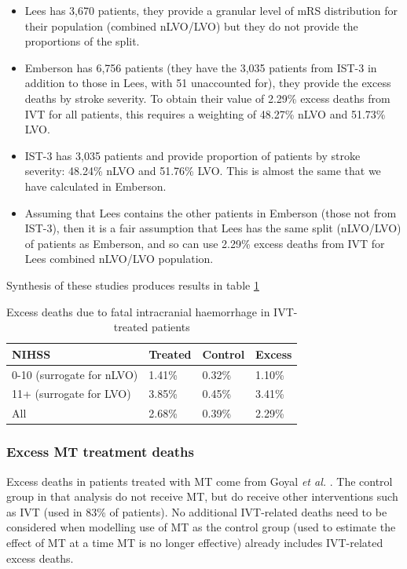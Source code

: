 \begin{itemize}
    \item Lees has 3,670 patients, they provide a granular level of mRS distribution for their population (combined nLVO/LVO) but they do not provide the proportions of the split.
    \item Emberson has 6,756 patients (they have the 3,035 patients from IST-3 in addition to those in Lees, with 51 unaccounted for), they provide the excess deaths by stroke severity. To obtain their value of 2.29\% excess deaths from IVT for all patients, this requires a weighting of 48.27\% nLVO and 51.73\% LVO.
    \item IST-3 has 3,035 patients and provide proportion of patients by stroke severity: 48.24\% nLVO and 51.76\% LVO. This is almost the same that we have calculated in Emberson.
    \item Assuming that Lees contains the other patients in Emberson (those not from IST-3), then it is a fair assumption that Lees has the same split (nLVO/LVO) of patients as Emberson, and so can use 2.29\% excess deaths from IVT for Lees combined nLVO/LVO population.
\end{itemize}

Synthesis of these studies produces results in table \ref{tab:ivt_deaths}

\begin{table}[!ht]
    \caption{Excess deaths due to fatal intracranial haemorrhage in IVT-treated patients}
    \centering
    \begin{tabular}{llll}
    \hline
        NIHSS & Treated & Control & Excess \\ \hline
        0-10 (surrogate for nLVO) & 1.41\% & 0.32\% & 1.10\% \\ 
        11+ (surrogate for LVO) & 3.85\% & 0.45\% & 3.41\% \\
        All & 2.68\% & 0.39\% & 2.29\% \\ \hline
    \end{tabular}
    \label{tab:ivt_deaths}
\end{table}

\subsubsection{Excess MT treatment deaths}
\label{excess_deaths_mt}

Excess deaths in patients treated with MT come from Goyal \textit{et al.} \cite{goyal_endovascular_2016}. The control group in that analysis do not receive MT, but do receive other interventions such as IVT (used in 83\% of patients). No additional IVT-related deaths need to be considered when modelling use of MT as the control group (used to estimate the effect of MT at a time MT is no longer effective) already includes IVT-related excess deaths.

